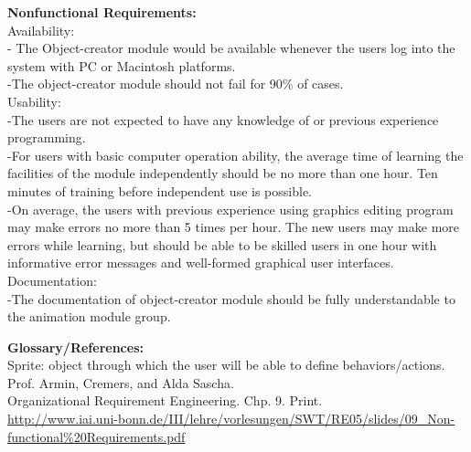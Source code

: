 \documentclass[12pt]{report}
\begin{document}
\pagebreak


{\bf\large Nonfunctional Requirements:}\\[1\baselineskip]
Availability: \\
- The Object-creator module would be available whenever the users log into the system with PC or Macintosh platforms.\\
-The object-creator module should not fail for 90\% of cases.\\[0\baselineskip]

Usability: \\
-The users are not expected to have any knowledge of or previous experience programming.\\
-For users with basic computer operation ability, the average time of learning the facilities of the module independently should be no more than one hour. Ten minutes of training before independent use is possible. \\
-On average, the users with previous experience using graphics editing program may make errors no more than 5 times per hour. The new users may make more errors while learning, but should be able to be skilled users in one hour with informative error messages and well-formed graphical user interfaces.\\[0\baselineskip]

Documentation:\\
-The documentation of object-creator module should be fully understandable to the animation module group.\\
\pagebreak

{\bf\large Glossary/References:}\\[1\baselineskip]
Sprite: object through which the user will be able to define behaviors/actions.
\\[1\baselineskip]
Prof. Armin, Cremers, and Alda Sascha. \\
Organizational Requirement Engineering. Chp. 9. Print.\\
\url{http://www.iai.uni-bonn.de/III/lehre/vorlesungen/SWT/RE05/slides/09_Non-functional\%20Requirements.pdf}
\end{document}
